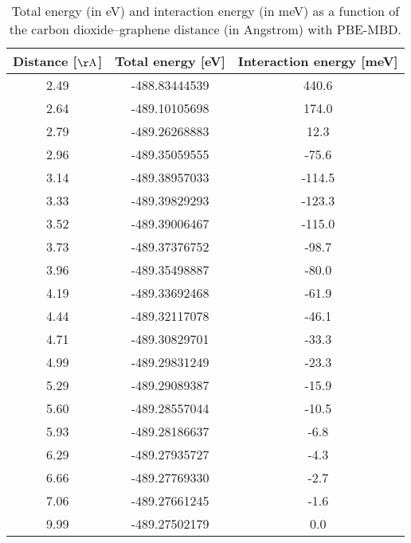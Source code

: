 \begin{table}[h]
\centering
\begin{tabular}{ccc}
\hline
Distance [$\mathrm{\AA}$] & Total energy [eV] & Interaction energy [meV] \\
\hline
2.49 & -488.83444539 & 440.6 \\
2.64 & -489.10105698 & 174.0 \\
2.79 & -489.26268883 & 12.3 \\
2.96 & -489.35059555 & -75.6 \\
3.14 & -489.38957033 & -114.5 \\
3.33 & -489.39829293 & -123.3 \\
3.52 & -489.39006467 & -115.0 \\
3.73 & -489.37376752 & -98.7 \\
3.96 & -489.35498887 & -80.0 \\
4.19 & -489.33692468 & -61.9 \\
4.44 & -489.32117078 & -46.1 \\
4.71 & -489.30829701 & -33.3 \\
4.99 & -489.29831249 & -23.3 \\
5.29 & -489.29089387 & -15.9 \\
5.60 & -489.28557044 & -10.5 \\
5.93 & -489.28186637 & -6.8 \\
6.29 & -489.27935727 & -4.3 \\
6.66 & -489.27769330 & -2.7 \\
7.06 & -489.27661245 & -1.6 \\
9.99 & -489.27502179 & 0.0 \\
\hline
\end{tabular}
\caption{Total energy (in eV) and interaction energy (in meV) as a function of the carbon dioxide--graphene distance (in Angstrom) with PBE-MBD.}
\label{SI_dft_table_PBE-MBD}
\end{table}